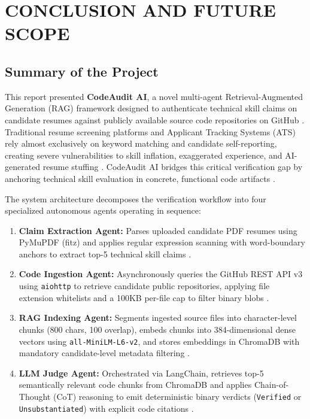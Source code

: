 \chapter{CONCLUSION AND FUTURE SCOPE}

\section{Summary of the Project}

This report presented \textbf{CodeAudit AI}, a novel multi-agent Retrieval-Augmented Generation (RAG) framework designed to authenticate technical skill claims on candidate resumes against publicly available source code repositories on GitHub \cite{ref20, ref38}. Traditional resume screening platforms and Applicant Tracking Systems (ATS) rely almost exclusively on keyword matching and candidate self-reporting, creating severe vulnerabilities to skill inflation, exaggerated experience, and AI-generated resume stuffing \cite{ref1, ref9, ref17}. CodeAudit AI bridges this critical verification gap by anchoring technical skill evaluation in concrete, functional code artifacts \cite{ref12, ref7, ref35}.

The system architecture decomposes the verification workflow into four specialized autonomous agents operating in sequence:
\begin{enumerate}[leftmargin=*, label=\arabic*.]
    \item \textbf{Claim Extraction Agent:} Parses uploaded candidate PDF resumes using PyMuPDF (fitz) and applies regular expression scanning with word-boundary anchors to extract top-5 technical skill claims \cite{ref40}.
    \item \textbf{Code Ingestion Agent:} Asynchronously queries the GitHub REST API v3 using \texttt{aiohttp} to retrieve candidate public repositories, applying file extension whitelists and a 100KB per-file cap to filter binary blobs \cite{ref12, ref35}.
    \item \textbf{RAG Indexing Agent:} Segments ingested source files into character-level chunks (800 chars, 100 overlap), embeds chunks into 384-dimensional dense vectors using \texttt{all-MiniLM-L6-v2}, and stores embeddings in ChromaDB with mandatory candidate-level metadata filtering \cite{ref31, ref33, ref41}.
    \item \textbf{LLM Judge Agent:} Orchestrated via LangChain, retrieves top-5 semantically relevant code chunks from ChromaDB and applies Chain-of-Thought (CoT) reasoning to emit deterministic binary verdicts (\texttt{Verified} or \texttt{Unsubstantiated}) with explicit code citations \cite{ref10, ref27, ref25, ref42}.
\end{enumerate}

